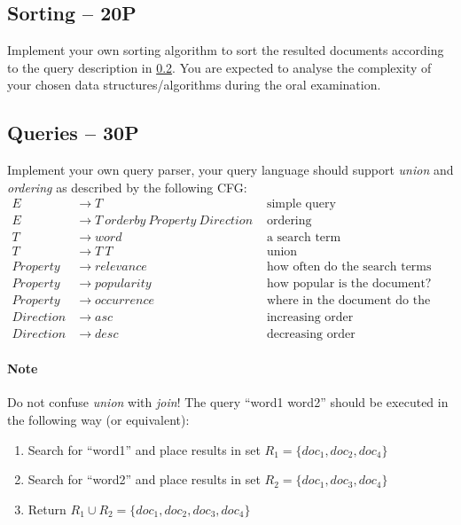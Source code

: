 \documentclass[11pt]{article}
\begin{document}
\subsection{Sorting -- 20P} 
Implement your own sorting algorithm to sort the resulted documents according to the query description in \ref{sec:queries}. You are expected to analyse the complexity of your chosen data structures/algorithms during the oral examination.

\subsection{Queries -- 30P} 
\label{sec:queries}
Implement your own query parser, your query language should support \emph{union} and \emph{ordering} as described by the following CFG:
\begin{align*}
E &\to T &\mbox{ simple query}\\
E &\to T \ orderby \ Property \ Direction &\mbox{ ordering}\\
T &\to word &\mbox{ a search term} \\
T &\to T \ T &\mbox{ union} \\
Property &\to relevance &\mbox{ how often do the search terms appear in a document?}\\
Property &\to popularity &\mbox{ how popular is the document?}\\
Property &\to occurrence &\mbox{ where in the document do the search terms appear?}\\
Direction &\to asc &\mbox{ increasing order}\\
Direction &\to desc &\mbox{ decreasing order}
\end{align*}

\paragraph{Note} Do not confuse \emph{union} with \emph{join}! The query ``word1 word2'' should be executed in the following way (or equivalent):
\begin{enumerate}[1)]
\item Search for ``word1'' and place results in set $R_1=\{doc_1, doc_2, doc_4\}$
\item Search for ``word2'' and place results in set $R_2=\{doc_1, doc_3, doc_4\}$
\item Return $R_1\cup R_2 = \{doc_1, doc_2, doc_3, doc_4\}$
\end{enumerate}
\end{document}
